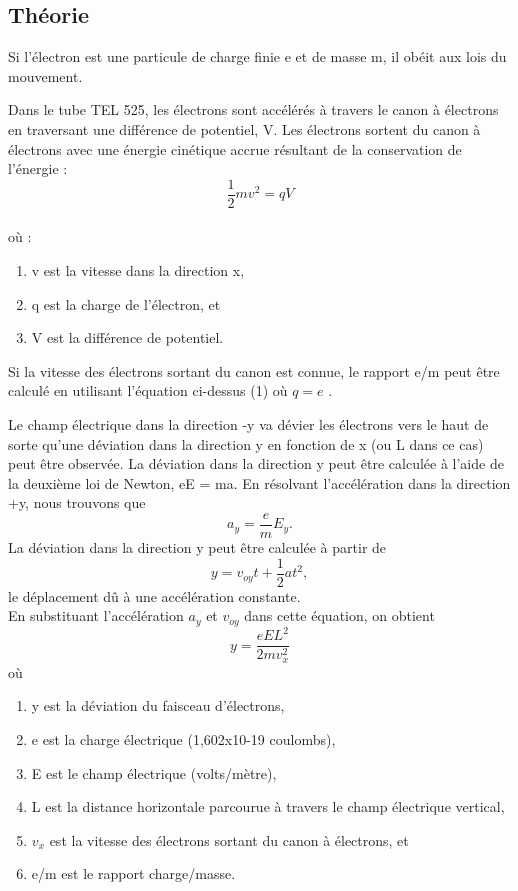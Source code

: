 \documentclass[../main.tex]{subfiles}
\begin{document}
\subsection{Théorie}
Si l'électron est une particule de charge finie e et de masse m, il obéit aux lois du mouvement. \\
\par Dans le tube TEL 525, les électrons sont accélérés à travers le canon à électrons en traversant une différence de potentiel, V. Les électrons sortent du canon à électrons avec une énergie cinétique accrue résultant de la conservation de l'énergie :\\
$$\frac{1}{2}mv^2 = qV$$\\
où :\\
\begin{enumerate}
    \item v est la vitesse dans la direction x, 
    \item q est la charge de l'électron, et 
    \item V est la différence de potentiel. 
\end{enumerate}
Si la vitesse des électrons sortant du canon est connue, le rapport e/m peut être calculé en utilisant l'équation ci-dessus (1) où $q = e$ .\\
\par Le champ électrique dans la direction -y va dévier les électrons vers le haut de sorte qu'une déviation dans la direction y en fonction de x (ou L dans ce cas) peut être observée.  La déviation dans la direction y peut être calculée à l'aide de la deuxième loi de Newton, eE = ma.  En résolvant l'accélération dans la direction +y, nous trouvons que\\
$$a_y = \frac{e}{m}E_y.$$ 
La déviation dans la direction y peut être calculée à partir de\\
$$y = v_{oy}t + \frac{1}{2}at^2,$$
le déplacement dû à une accélération constante.\\    En substituant l'accélération $a_y$ et $v_{oy}$ dans cette équation, on obtient \\
$$y = \frac{eEL^2}{2mv_x^2}$$
où\\
\begin{enumerate}
    \item y est la déviation du faisceau d'électrons,
    \item e est la charge électrique (1,602x10-19 coulombs),
    \item E est le champ électrique (volts/mètre), 
    \item L est la distance horizontale parcourue à travers le champ électrique vertical,
    \item $v_x$ est la vitesse des électrons sortant du canon à électrons, et
    \item e/m est le rapport charge/masse.
\end{enumerate}
\end{document}
